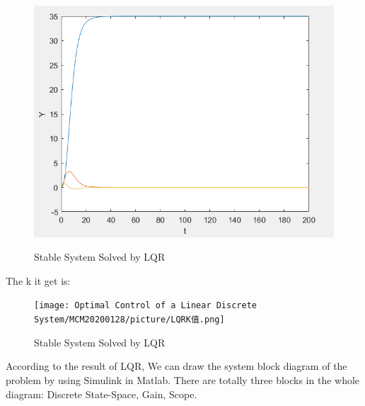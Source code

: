 \documentclass{mcmthesis}
\begin{document}
\begin{figure}[H]%
  \centering
  \caption{Stable System Solved by LQR}
  \includegraphics[width=50ex]{Optimal Control of a Linear Discrete System/MCM20200128/picture/LQR结果.png} %
  \label{Fig.RNN} %
\end{figure}
The k it get is:
\begin{figure}[H]%
  \centering
  \caption{Stable System Solved by LQR}
  \texttt{[image: Optimal Control of a Linear Discrete System/MCM20200128/picture/LQRK值.png]} %
  \label{Fig.RNN} %
\end{figure}
According to the result of LQR, We can draw the system block diagram of the problem by using Simulink in Matlab. There are totally three blocks in the whole diagram: Discrete State-Space, Gain, Scope.
\end{document}
